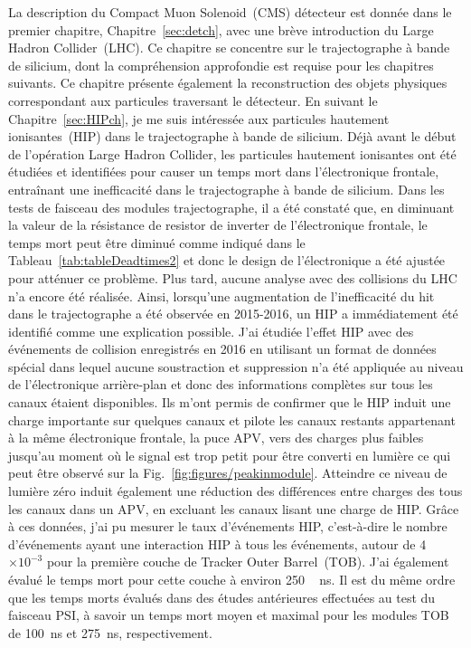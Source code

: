 La description du Compact Muon Solenoid~(CMS)  détecteur est donnée dans le premier chapitre, Chapitre~\ref{sec:detch}, avec une brève introduction du Large Hadron Collider~(LHC). Ce chapitre se concentre sur le trajectographe à bande de silicium, dont la compréhension approfondie est requise pour les chapitres suivants. Ce chapitre présente également la reconstruction des objets physiques correspondant aux particules traversant le détecteur. En suivant le Chapitre~\ref{sec:HIPch}, je me suis intéressée aux particules hautement ionisantes~(HIP) dans le trajectographe à bande de silicium. Déjà avant le début de l'opération Large Hadron Collider, les particules hautement ionisantes ont été étudiées et identifiées pour causer un temps mort dans l'électronique frontale, entraînant une inefficacité dans le trajectographe à bande de silicium. Dans les tests de faisceau des modules trajectographe, il a été constaté que, en diminuant la valeur de la résistance de resistor de inverter de l’électronique frontale, le temps mort peut être diminué comme indiqué dans le Tableau~\ref{tab:tableDeadtimes2} et donc le design de l'électronique a été ajustée pour atténuer ce problème. Plus tard, aucune analyse avec des collisions du LHC n'a encore été réalisée. Ainsi, lorsqu'une augmentation de l'inefficacité du hit dans le trajectographe a été observée en 2015-2016, un HIP a immédiatement été identifié comme une explication possible. J'ai étudiée l'effet HIP avec des événements de collision enregistrés en 2016 en utilisant un format de données spécial dans lequel aucune soustraction et suppression n'a été appliquée au niveau de l'électronique arrière-plan et donc des informations complètes sur tous les canaux étaient disponibles. Ils m'ont permis de confirmer que le HIP induit une charge importante sur quelques canaux et pilote les canaux restants appartenant à la même électronique frontale, la puce APV, vers des charges plus faibles jusqu'au moment où le signal est trop petit pour être converti en lumière ce qui peut être observé sur la Fig.~\ref{fig:figures/peakinmodule}. Atteindre ce niveau de lumière zéro induit également une réduction des différences entre charges des tous les canaux dans un APV, en excluant les canaux lisant une charge de HIP. Grâce à ces données, j'ai pu mesurer le taux d'événements HIP, c'est-à-dire le nombre d'événements ayant une interaction HIP  à  tous les événements, autour de 4 $\times 10^{-3} $ pour la première couche de Tracker Outer Barrel~(TOB). J'ai également évalué le temps mort pour cette couche à environ 250 ~ ns. Il est du même ordre que les temps morts évalués dans des études antérieures effectuées au test du faisceau PSI, à savoir un temps mort moyen et maximal pour les modules TOB de 100~ns et 275~ns, respectivement.


